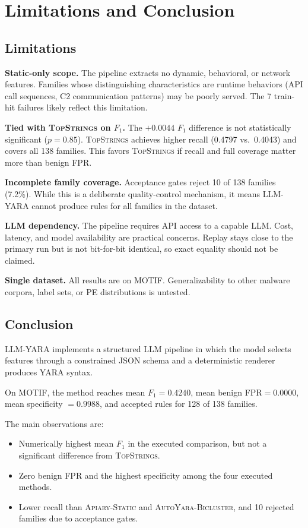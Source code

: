 \documentclass[10pt,twocolumn]{article}
\newcommand{\sysname}{\textsc{LLM-YARA}\xspace}
\newcommand{\topstrings}{\textsc{TopStrings}\xspace}
\newcommand{\apiary}{\textsc{Apiary-Static}\xspace}
\newcommand{\autoyara}{\textsc{AutoYara-Bicluster}\xspace}
\newcommand{\motif}{\textsc{MOTIF}\xspace}
\begin{document}
\section{Limitations and Conclusion}
\label{sec:conclusion}

\subsection{Limitations}

\textbf{Static-only scope.}  The pipeline extracts no dynamic,
behavioral, or network features.  Families whose distinguishing
characteristics are runtime behaviors (API call sequences, C2
communication patterns) may be poorly served.  The 7 train-hit
failures likely reflect this limitation.

\textbf{Tied with \topstrings on $F_1$.}  The $+0.0044$ $F_1$
difference is not statistically significant ($p=0.85$).  \topstrings
achieves higher recall (0.4797 vs.\ 0.4043) and covers all 138
families.  This favors \topstrings if recall and full coverage matter
more than benign FPR.

\textbf{Incomplete family coverage.}  Acceptance gates reject 10 of
138 families (7.2\%).  While this is a deliberate quality-control
mechanism, it means \sysname cannot produce rules for all families in
the dataset.

\textbf{LLM dependency.}  The pipeline requires API access to a
capable LLM.  Cost, latency, and model availability are practical
concerns.  Replay stays close to the primary run but is not bit-for-bit
identical, so exact equality should not be claimed.

\textbf{Single dataset.}  All results are on \motif.
Generalizability to other malware corpora, label sets, or PE
distributions is untested.

\subsection{Conclusion}

\sysname implements a structured LLM pipeline in which the model
selects features through a constrained JSON schema and a deterministic
renderer produces YARA syntax.

On \motif, the method reaches mean $F_1=0.4240$, mean benign
FPR$=0.0000$, mean specificity $=0.9988$, and accepted rules for
128 of 138 families.

The main observations are:
\begin{itemize}[nosep,leftmargin=1.2em]
  \item Numerically highest mean $F_1$ in the executed comparison, but not a
    significant difference from \topstrings.
  \item Zero benign FPR and the highest specificity among the four
    executed methods.
  \item Lower recall than \apiary and \autoyara, and 10 rejected
    families due to acceptance gates.
\end{itemize}
\end{document}
